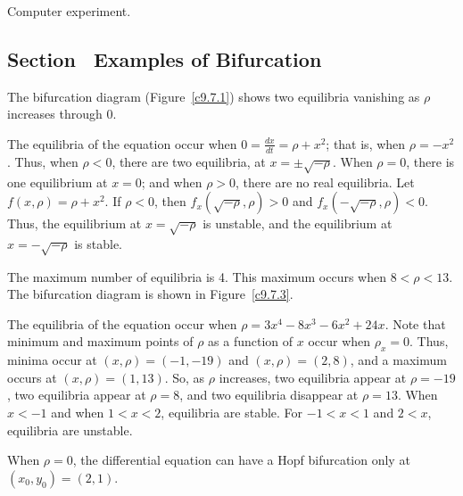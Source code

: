   Computer experiment.



\subsection*{Section~\protect{\ref{S:bifurcation}} Examples of Bifurcation}

\ans The bifurcation diagram (Figure~\ref{c9.7.1}) shows two equilibria
vanishing as $\rho$ increases through $0$.

\soln The equilibria of the equation occur when $0 = \frac{dx}{dt} =
\rho + x^2$; that is, when $\rho = -x^2$.  Thus, when $\rho < 0$, there
are two equilibria, at $x = \pm\sqrt{-\rho}$.  When $\rho = 0$, there is
one equilibrium at $x = 0$; and when $\rho > 0$, there are no real
equilibria.  Let $f(x,\rho) = \rho + x^2$.  If $\rho < 0$, 
then $f_x(\sqrt{-\rho},\rho) > 0$ and $f_x(-\sqrt{-\rho},\rho) < 0$. 
Thus, the equilibrium at $x = \sqrt{-\rho}$ is unstable, and the
equilibrium at $x = -\sqrt{-\rho}$ is stable.

\begin{figure}[htb]
                       \centerline{%
                       }
\end{figure}

\ans The maximum number of equilibria is 4.  This maximum occurs when
$8 < \rho < 13$.  The bifurcation diagram is shown in Figure~\ref{c9.7.3}.

\soln The equilibria of the equation occur when
$\rho = 3x^4 - 8x^3 - 6x^2 + 24x$.  Note that minimum and maximum points of
$\rho$ as a function of $x$ occur when $\rho_x = 0$.  Thus, minima occur
at $(x,\rho) = (-1,-19)$ and $(x,\rho) = (2,8)$, and a maximum occurs at
$(x,\rho) = (1,13)$.  So, as $\rho$ increases, two equilibria appear at
$\rho = -19$, two equilibria appear at $\rho = 8$, and two equilibria
disappear at $\rho = 13$.  When $x < -1$ and when $1 < x < 2$, equilibria
are stable.  For $-1 < x < 1$ and $2 < x$, equilibria are unstable.

\begin{figure}[htb]
                       \centerline{%
                       }
\end{figure}

\ans When $\rho = 0$, the differential equation can have a Hopf bifurcation 
only at $(x_0,y_0) = (2,1)$.

